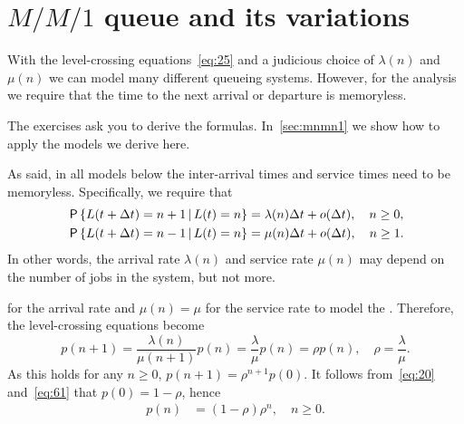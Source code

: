 

\section{$M/M/1$ queue and its variations}
\label{sec:mm1}


With the level-crossing equations~\cref{eq:25} and a judicious choice of $\lambda(n)$ and $\mu(n)$ we can model many different queueing systems.
However, for the analysis we require that the time to the next arrival or departure is memoryless.

The exercises ask you to derive the formulas. In~\cref{sec:mnmn1} we show how to apply the models we derive here.


As said, in all models below the inter-arrival times and service times need to be memoryless.
Specifically,  we require that
\begin{align*}
  \,\mathsf{P}\left\{L(t+\Delta t) = n+1 \,\middle|\, L(t) = n \right\} &= \lambda(n) \Delta t + o(\Delta t), \quad n\geq 0,\\
  \,\mathsf{P}\left\{L(t+\Delta t) = n-1 \,\middle|\, L(t) = n \right\} &= \mu(n) \Delta t + o(\Delta t), \quad n \geq 1.
\end{align*}
In other words, the arrival rate $\lambda(n)$ and service rate $\mu(n)$ may depend on the number of jobs in the system, but not more. 


 for the arrival rate and $\mu(n)=\mu$ for the service rate to model the .
Therefore, the level-crossing equations become
\begin{equation*}
 p(n+1) = \frac{\lambda(n)}{\mu(n+1)} p(n) = \frac{\lambda}{\mu} p(n) = \rho p(n),\quad \rho = \frac{\lambda}{\mu}.
\end{equation*}
As this holds for any $n\geq 0$, $p(n+1) = \rho^{n+1} p(0)$.
It follows from~\cref{eq:20} and~\cref{eq:61} that $p(0) =1-\rho$, hence
\begin{align}\label{eq:23}
p(n) &= (1-\rho)\rho^{n}, \quad n \geq 0.
\end{align}

